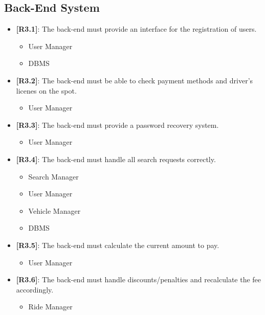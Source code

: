\subsection{Back-End System}
\begin{itemize}
	\item {\textbf{[R3.1]}}: The back-end must provide an interface for 	the registration of users.
	\begin{itemize}
	\item User Manager
	\item DBMS\\
	\end{itemize}

	\item {\textbf{[R3.2]}}: The back-end must be able to check payment 	methods and driver’s licenes on the spot.
	\begin{itemize}
	\item User Manager\\
	\end{itemize}
	
	\item {\textbf{[R3.3]}}: The back-end must provide a password 			recovery system.
	\begin{itemize}
	\item User Manager\\
	\end{itemize}
	
	\item {\textbf{[R3.4]}}: The back-end must handle all search requests correctly.
	\begin{itemize}
	\item Search Manager
	\item User Manager
	\item Vehicle Manager
	\item DBMS\\
	\end{itemize}
	
	\item {\textbf{[R3.5]}}: The back-end must calculate the current amount to pay.
	\begin{itemize}
	\item User Manager\\
	\end{itemize}
	
	\item {\textbf{[R3.6]}}: The back-end must handle discounts/penalties and recalculate the fee accordingly.
	\begin{itemize}
	\item Ride Manager\\
	\end{itemize}


\end{itemize}
